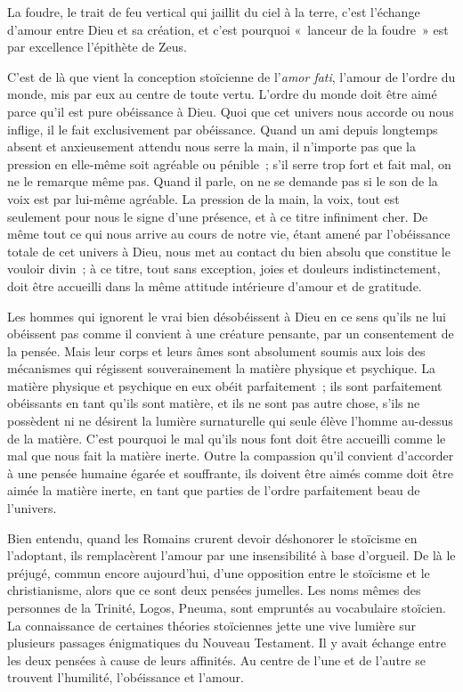 \documentclass[french,twoside]{book} %
\begin{document}
\noindent La foudre, le trait de feu vertical qui jaillit du ciel à la terre, c'est l'échange d'amour entre Dieu et sa création, et c'est pourquoi « lanceur de la foudre » est par excellence l'épithète de Zeus.\par
C'est de là que vient la conception stoïcienne de l'{\itshape amor fati}, l'amour de l'ordre du monde, mis par eux au centre de toute vertu. L'ordre du monde doit être aimé parce qu'il est pure obéissance à Dieu. Quoi que cet univers nous accorde ou nous inflige, il le fait exclusivement par obéissance. Quand un ami depuis longtemps absent et anxieusement attendu nous serre la main, il n'importe pas que la pression en elle-même soit agréable ou pénible ; s'il serre trop fort et fait mal, on ne le remarque même pas. Quand il parle, on ne se demande pas si le son de la voix est par lui-même agréable. La pression de la main, la voix, tout est seulement pour nous le signe d'une présence, et à ce titre infiniment cher. De même tout ce qui nous arrive au cours de notre vie, étant amené par l'obéissance totale de cet univers à Dieu, nous met au contact du bien absolu que constitue le vouloir divin ; à ce titre, tout sans exception, joies et douleurs indistinctement, doit être accueilli dans la même attitude intérieure d'amour et de gratitude.\par
Les hommes qui ignorent le vrai bien désobéissent à Dieu en ce sens qu'ils ne lui obéissent pas comme il convient à une créature pensante, par un consentement de la pensée. Mais leur corps et leurs âmes sont absolument soumis aux lois des mécanismes qui régissent souverainement la matière physique et psychique. La matière physique et psychique en eux obéit parfaitement ; ils sont parfaitement obéissants en tant qu'ils sont matière, et ils ne sont pas autre chose, s'ils ne possèdent ni ne désirent la lumière surnaturelle qui seule élève l'homme au-dessus de la matière. C'est pourquoi le mal qu'ils nous font doit être accueilli comme le mal que nous fait la matière inerte. Outre la compassion qu'il convient d'accorder à une pensée humaine égarée et souffrante, ils doivent être aimés comme doit être aimée la matière inerte, en tant que parties de l'ordre parfaitement beau de l'univers.\par
Bien entendu, quand les Romains crurent devoir déshonorer le stoïcisme en l'adoptant, ils remplacèrent l'amour par une insensibilité à base d'orgueil. De là le préjugé, commun encore aujourd'hui, d'une opposition entre le stoïcisme et le christianisme, alors que ce sont deux pensées jumelles. Les noms mêmes des personnes de la Trinité, Logos, Pneuma, sont empruntés au vocabulaire stoïcien. La connaissance de certaines théories stoïciennes jette une vive lumière sur plusieurs passages énigmatiques du Nouveau Testament. Il y avait échange entre les deux pensées à cause de leurs affinités. Au centre de l'une et de l'autre se trouvent l'humilité, l'obéissance et l'amour.\par
\end{document}
